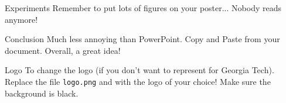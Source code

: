 \documentclass[serif,mathserif,final]{beamer}
\begin{document}
\begin{frame}{}
\begin{columns}[t]
\begin{column}{0.32\linewidth}
    \end{column}%

    \begin{column}{0.32\linewidth}

      \begin{block}{Experiments}
        Remember to put lots of figures on your poster... Nobody reads anymore!
      \end{block}

      \begin{block}{Conclusion}
        Much less annoying than PowerPoint.  Copy and Paste from your
        document. Overall, a great idea!
      \end{block}

      \begin{block}{Logo}
        To change the logo (if you don't want to represent for Georgia Tech).
        Replace the file {\tt logo.png} and with the logo of your choice!
        Make sure the background is black.
      \end{block}

    \end{column}%

  \end{columns}
\end{frame}
\end{document}
